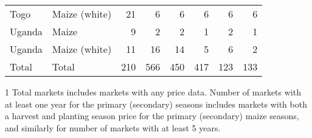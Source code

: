 \begin{table}[ht]
\begin{threeparttable}[t]
\begin{tabular}{|ll|rr|rr|rr|}
  Togo & Maize (white) &  21 &   6 &   6 &   6 &   6 &   6 \\ 
  Uganda & Maize &   9 &   2 &   2 &   1 &   2 &   1 \\ 
  Uganda & Maize (white) &  11 &  16 &  14 &   5 &   6 &   2 \\ 
  \hline
  Total & Total & 210 & 566 & 450 & 417 & 123 & 133 \\ 
   \hline
\end{tabular}
\begin{tablenotes}
\item [1] \footnotesize Total markets includes markets with any price data. Number of markets with at least one year for the primary (secondary) seasons includes markets with both a harvest and planting season price for the primary (secondary) maize seasons, and similarly for number of markets with at least 5 years. 
\end{tablenotes}
\end{threeparttable}
\end{table}
